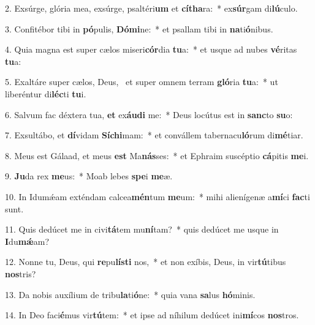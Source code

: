 2. Exsúrge, glória mea, exsúrge, psaltéri\textbf{um} et \textbf{cí}\textbf{tha}ra:~*  ex\textbf{súr}gam di\textbf{lú}culo.\

3. Confitébor tibi in \textbf{pó}pulis, \textbf{Dó}\textbf{mi}ne:~*  et psallam tibi in \textbf{na}ti\textbf{ó}nibus.\

4. Quia magna est super cælos miseri\textbf{cór}dia \textbf{tu}a:~*  et usque ad nubes \textbf{vé}ritas \textbf{tu}a:\

5. Exaltáre super cælos, Deus, \dag\  et super omnem terram \textbf{gló}ria \textbf{tu}a:~*  ut liberéntur di\textbf{léc}ti \textbf{tu}i.\

6. Salvum fac déxtera tua, \textbf{et} ex\textbf{áu}\textbf{di} me:~*  Deus locútus est in \textbf{sanc}to \textbf{su}o:\

7. Exsultábo, et \textbf{dí}vidam \textbf{Sí}\textbf{chi}mam:~*  et convállem tabernacu\textbf{ló}rum di\textbf{mé}tiar.\

8. Meus est Gálaad, et meus \textbf{est} Ma\textbf{nás}ses:~*  et Ephraim suscéptio \textbf{cá}pitis \textbf{me}i.\

9. \textbf{Ju}da rex \textbf{me}us:~*  Moab lebes \textbf{spe}i \textbf{me}æ.\

10. In Idumǽam exténdam calcea\textbf{mén}tum \textbf{me}um:~*  mihi alienígenæ a\textbf{mí}ci \textbf{fac}ti sunt.\

11. Quis dedúcet me in civi\textbf{tá}tem mu\textbf{ní}tam?~*  quis dedúcet me usque in \textbf{I}du\textbf{mǽ}am?\

12. Nonne tu, Deus, qui \textbf{re}pu\textbf{lís}\textbf{ti} nos,~*  et non exíbis, Deus, in vir\textbf{tú}tibus \textbf{nos}tris?\

13. Da nobis auxílium de tribu\textbf{la}ti\textbf{ó}ne:~*  quia vana \textbf{sa}lus \textbf{hó}minis.\

14. In Deo faci\textbf{é}mus vir\textbf{tú}tem:~*  et ipse ad níhilum dedúcet ini\textbf{mí}cos \textbf{nos}tros.\

